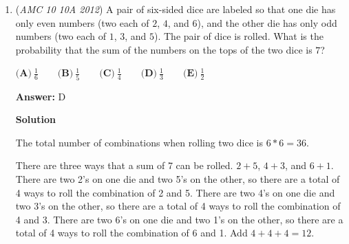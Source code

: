 \begin{enumerate}
 $\textbf{(A)}\ 4\qquad\textbf{(B)}\ 5\qquad\textbf{(C)}\ 6\qquad\textbf{(D)}\ 7\qquad\textbf{(E)}\ 8$

 \textbf{Answer: }D



\textbf{Solution 1}

Let the three numbers be equal to $a$, $b$, and $c$. We can now write three equations:

 $a+b=12$
$b+c=17$
$a+c=19$

 Adding these equations together, we get that

 $2(a+b+c)=48$ and

 $a+b+c=24$

 Substituting the original equations into this one, we find

 $c+12=24$
$a+17=24$
$b+19=24$

 Therefore, our numbers are 12, 7, and 5. The middle number is $\boxed{\textbf{(D)}\ 7}$




\textbf{Solution 2 (Faster)}

Let the three numbers be $a$, $b$ and $c$ and $a<b<c$. We get the three equations: 

 $a+b=12$
$a+c=17$
$b+c=19$

 To isolate $b$, We add the first and last equations and then subtract the second one.

 $(a+b)+(b+c)-(a+c) = 12+19-17 \Rightarrow 2b=14 \Rightarrow b = 7$

 Because $b$ is the middle number, the middle number is $\boxed{\textbf{(D)}\ 7}$



	\item (\textit{AMC 10 10A 2012}) A pair of six-sided dice are labeled so that one die has only even numbers (two each of $2$, $4$, and $6$), and the other die has only odd numbers (two each of $1$, $3$, and $5$). The pair of dice is rolled. What is the probability that the sum of the numbers on the tops of the two dice is $7$?


 $\textbf{(A)}\ \frac{1}{6}\qquad\textbf{(B)}\ \frac{1}{5}\qquad\textbf{(C)}\ \frac{1}{4}\qquad\textbf{(D)}\ \frac{1}{3}\qquad\textbf{(E)}\ \frac{1}{2}$

 \textbf{Answer: }D



\textbf{Solution}

The total number of combinations when rolling two dice is $6*6 = 36$.

 There are three ways that a sum of 7 can be rolled. $2+5$, $4+3$, and $6+1$. There are two 2's on one die and two 5's on the other, so there are a total of 4 ways to roll the combination of 2 and 5. There are two 4's on one die and two 3's on the other, so there are a total of 4 ways to roll the combination of 4 and 3. There are two 6's on one die and two 1's on the other, so there are a total of 4 ways to roll the combination of 6 and 1. Add $4 + 4 + 4 = 12$.


\end{enumerate}
